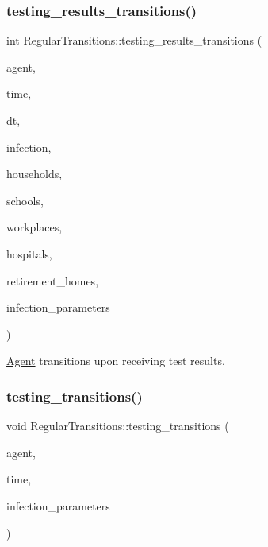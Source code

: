 \subsubsection{\texorpdfstring{testing\+\_\+results\+\_\+transitions()}{testing\_results\_transitions()}}
{\footnotesize\ttfamily int Regular\+Transitions\+::testing\+\_\+results\+\_\+transitions (\begin{DoxyParamCaption}\item[{\hyperlink{classAgent}{Agent} \&}]{agent,  }\item[{const double}]{time,  }\item[{const double}]{dt,  }\item[{\hyperlink{classInfection}{Infection} \&}]{infection,  }\item[{std\+::vector$<$ \hyperlink{classHousehold}{Household} $>$ \&}]{households,  }\item[{std\+::vector$<$ \hyperlink{classSchool}{School} $>$ \&}]{schools,  }\item[{std\+::vector$<$ \hyperlink{classWorkplace}{Workplace} $>$ \&}]{workplaces,  }\item[{std\+::vector$<$ \hyperlink{classHospital}{Hospital} $>$ \&}]{hospitals,  }\item[{std\+::vector$<$ \hyperlink{classRetirementHome}{Retirement\+Home} $>$ \&}]{retirement\+\_\+homes,  }\item[{const std\+::map$<$ std\+::string, double $>$ \&}]{infection\+\_\+parameters }\end{DoxyParamCaption})}



\hyperlink{classAgent}{Agent} transitions upon receiving test results. 

\mbox{\label{classRegularTransitions_a509724bc00971b19a8ac9569cbc84de2}} 
\subsubsection{\texorpdfstring{testing\+\_\+transitions()}{testing\_transitions()}}
{\footnotesize\ttfamily void Regular\+Transitions\+::testing\+\_\+transitions (\begin{DoxyParamCaption}\item[{\hyperlink{classAgent}{Agent} \&}]{agent,  }\item[{const double}]{time,  }\item[{const std\+::map$<$ std\+::string, double $>$ \&}]{infection\+\_\+parameters }\end{DoxyParamCaption})}



